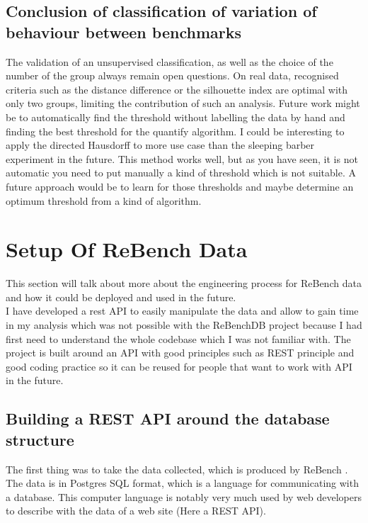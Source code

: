 \documentclass[12pt,a4paper]{article}
\begin{document}
\pagebreak
\newpage


\subsection{Conclusion of classification of variation of behaviour between benchmarks}

The validation of an unsupervised classification, as well as the choice of the number of the group always remain open questions. On real data, recognised criteria such as the distance difference or the silhouette index are optimal with only two groups, limiting the contribution of such an analysis.
Future work might be to automatically find the threshold without labelling the data by hand and finding the best threshold for the quantify algorithm.
I could be interesting to apply the directed Hausdorff to more use case than the sleeping barber experiment in the future.
This method works well, but as you have seen, it is not automatic you need to put manually a kind of threshold which is not suitable.
A future approach would be to learn for those thresholds and maybe determine an optimum threshold from a kind of algorithm.



\section{Setup Of ReBench Data}
This section will talk about more about the engineering process for ReBench data and how it could be deployed and used in the future.\\
I have developed a rest API to easily manipulate the data and allow to gain time in my analysis which was not possible with the ReBenchDB project because I had first need to understand the whole codebase which I was not familiar with. The project is built around an API with good principles such as REST principle and good coding practice so it can be reused for people that want to work with API in the future.

\subsection{Building a REST API around the database structure}

The first thing was to take the data collected, which is produced by ReBench \citep{ReBench:2018}. The data is in Postgres SQL format, which is a language for communicating with a database. This computer language is notably very much used by web developers to describe with the data of a web site (Here a REST API).
\end{document}
